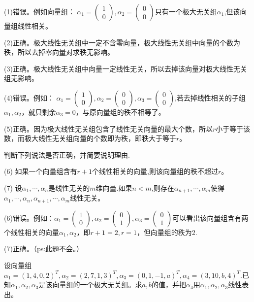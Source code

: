 \documentclass[a4paper]{report}
\begin{document}
\begin{jie}
(1)错误。例如向量组：
$\alpha_1=
\begin{pmatrix}
1\\ 0
\end{pmatrix},\alpha_2=
\begin{pmatrix}
0\\ 0
\end{pmatrix}
$只有一个极大无关组$\alpha_1$,但该向量组线性相关。

(2)正确。极大线性无关组中一定不含零向量，极大线性无关组中向量的个数为秩，所以去掉零向量对求秩无影响。

(3)正确。极大线性无关组中向量一定线性无关，所以去掉该向量对极大线性无关组无影响。

(4)错误。例如：
$\alpha_1=
\begin{pmatrix}
1\\ 0
\end{pmatrix},\alpha_2=
\begin{pmatrix}
0\\ 0
\end{pmatrix},\alpha_3=
\begin{pmatrix}
0\\ 0
\end{pmatrix}
$,若去掉线性相关的子组$\alpha_1,\alpha_2$，就只剩余$\alpha_3=0$，与原向量组的秩不相等了。

(5)正确。因为极大线性无关组包含了线性无关向量的最大个数，所以$r$小于等于该数，而极大线性无关组向量的个数即为秩，即秩大于等于$r$。
\end{jie}

\EX 判断下列说法是否正确，并简要说明理由.

(6) 如果一个向量组含有$r+1$个线性相关的向量,则该向量组的秩不超过$r$。

(7) 设$\alpha_1,\cdots,\alpha_n$是线性无关的$m$维向量.如果$n< m$,则存在$\alpha_{n+1},\cdots,\alpha_{m}$使得$\alpha_1,\cdots,\alpha_n,\alpha_{n+1},\cdots,\alpha_{m}$线性无关。

\begin{jie}
(6)错误。例如：$\alpha_1=
\begin{pmatrix}
1\\ 0
\end{pmatrix},\alpha_2=
\begin{pmatrix}
0\\ 1
\end{pmatrix},\alpha_3=
\begin{pmatrix}
0\\ 1
\end{pmatrix}
$可以看出该向量组含有两个线性相关的向量$\alpha_1,\alpha_2$，即$r+1=2,r=1$，但向量组的秩为2.

(7)正确。（\textcolor[rgb]{0.50,1.00,0.00}{ps:此题不会。}）
\end{jie}
\EX 设向量组$\alpha_1=(1,4,0,2)^T,\alpha_2=(2,7,1,3)^T,\alpha_3=(0,1,-1,a)^T,\alpha_4=(3,10,b,4)^T$.已知$\alpha_1,\alpha_2,\alpha_3$是该向量组的一个极大无关组。求$a,b$的值，并把$\alpha_4$用$\alpha_1,\alpha_2,\alpha_3$线性表出。
\end{document}

